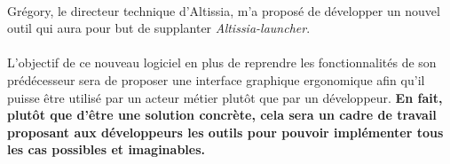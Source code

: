 
\paragraph{}
Grégory, le directeur technique d'Altissia, m'a proposé de développer un nouvel outil qui aura pour but de supplanter \textit{Altissia-launcher}.

\paragraph{}
L'objectif de ce nouveau logiciel en plus de reprendre les fonctionnalités de son prédécesseur sera de proposer une interface graphique ergonomique afin qu'il puisse être utilisé par un acteur métier plutôt que par un développeur.
\textbf{En fait, plutôt que d'être une solution concrète, cela sera un cadre de travail proposant aux développeurs les outils pour pouvoir implémenter tous les cas possibles et imaginables.}
